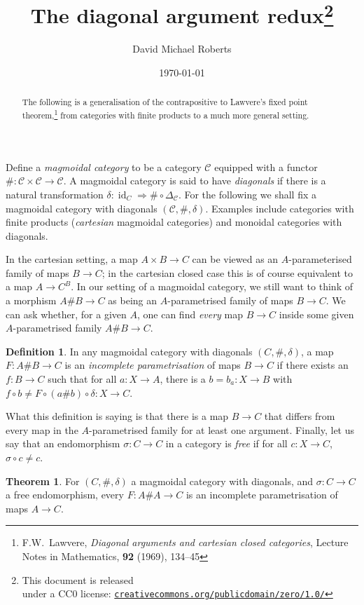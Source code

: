 \documentclass{tufte-handout}
\title{The diagonal argument redux\thanks{This document is released \\ under a CC0 license: \href{http://creativecommons.org/publicdomain/zero/1.0/}{\texttt{creativecommons.org/publicdomain/zero/1.0/}}}}
\author{David Michael Roberts}
\date{\today}
\theoremstyle{definition}
\newtheorem*{definition}{Definition}
\newtheorem*{theorem}{Theorem}
\DeclareMathOperator{\id}{id}
\def\CC{\mathcal{C}}
\begin{document}
\maketitle

\begin{abstract}
The following is a generalisation of the contrapositive to Lawvere's fixed point theorem,\footnote{F.W.~Lawvere, \emph{Diagonal arguments and cartesian closed categories}, Lecture Notes in Mathematics, \textbf{92} (1969), 134--45} from categories with finite products to a much more general setting.\end{abstract}

Define a \emph{magmoidal category} to be a category $\CC$ equipped with a functor $\# \colon \CC\times \CC\to \CC$.
A magmoidal category is said to have \emph{diagonals} if there is a natural transformation $\delta\colon \id_C \Rightarrow \#\circ \Delta_\CC$. 
For the following we shall fix a magmoidal category with diagonals $(\CC,\#,\delta)$.
Examples include categories with finite products (\emph{cartesian} magmoidal categories) and monoidal categories with diagonals.




In the cartesian setting, a map $A\times B \to C$ can be viewed as an $A$-parameterised family of maps $B\to C$; in the cartesian closed case this is of course equivalent to a map $A \to C^B$.
In our setting of a magmoidal category, we still want to think of a morphism $A\# B \to C$ as being an $A$-parametrised family of maps $B\to C$.
We can ask whether, for a given $A$, one can find \emph{every} map $B\to C$ inside some given $A$-parametrised family $A\# B \to C$.

\begin{definition}
In any magmoidal category with diagonals $(C,\#,\delta)$, a map $F\colon A\#B\to C$ is an \emph{incomplete parametrisation} of maps $B\to C$ if there exists an $f\colon B\to C$ such that for all $a\colon X\to A$, there is a $b = b_a\colon X\to B$ with $f\circ b \not= F\circ(a\# b)\circ \delta\colon X\to C$.
\end{definition}

\noindent
What this definition is saying is that there is a map $B\to C$ that differs from every map in the $A$-parametrised family for at least one argument.
Finally, let us say that an endomorphism $\sigma\colon C\to C$ in a category is \emph{free} if for all $c\colon X\to C$, $\sigma\circ c \not=c$.

\begin{theorem}
  For $(C,\#,\delta)$ a magmoidal category with diagonals, and $\sigma \colon C\to C$ a free endomorphism, every $F\colon A\# A \to C$ is an incomplete parametrisation of maps $A\to C$.
\end{theorem}
\end{document}
